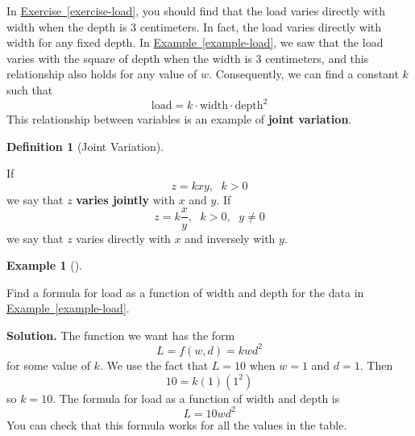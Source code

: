 \documentclass[10pt,]{book}
\newcommand{\terminology}[1]{\textbf{#1}}
\theoremstyle{plain}
\theoremstyle{definition}
\newtheorem{definition}[theorem]{Definition}
\theoremstyle{definition}
\theoremstyle{definition}
\newtheorem{example}[theorem]{Example}
\theoremstyle{definition}
\theoremstyle{definition}
\numberwithin{equation}{section}
\newcommand{\gt}{ > }
\begin{document}
    In \hyperref[exercise-load]{Exercise~\ref{exercise-load}}, you should find that the load varies directly with width when the depth is \(3\) centimeters. In fact, the load varies directly with width for any fixed depth. In \hyperref[example-load]{Example~\ref{example-load}}, we saw that the load varies with the square of depth when the width is \(3\) centimeters, and this relationship also holds for any value of \(w\). Consequently, we can find a constant \(k\) such that 
    \begin{equation*}\text{load} = k \cdot \text{width} \cdot \text{depth}^2\end{equation*}
    This relationship between variables is an example of \terminology{joint variation}.
%
\begin{definition}[Joint Variation]\label{definition-6}
%
\par

    If\begin{equation*}z = kxy \text{, } ~~ k \gt 0\end{equation*}
    we say that \(z\) \terminology{varies jointly} with \(x\) and \(y\). If
    \begin{equation*}z = k\frac{x}{y}\text{, } ~~ k \gt 0\text{, } ~~ y  \ne 0\end{equation*}
    we say that \(z\) varies directly with \(x\) and inversely with \(y\).
%
\end{definition}
\begin{example}[]\label{example-load2}

    Find a formula for load as a function of width and depth for the data in \hyperref[example-load]{Example~\ref{example-load}}.
%
\par\medskip\noindent%
\textbf{Solution.}\quad 
    The function we want has the form
    \begin{equation*}L = f (w, d) = kwd^2\end{equation*}
    for some value of \(k\). We use the fact that \(L = 10\) when \(w = 1\) and \(d = 1\). Then
    \begin{equation*}10 = k(1)(1^2)\end{equation*}
    so \(k = 10\). The formula for load as a function of width and depth is
    \begin{equation*}L = 10wd^2\end{equation*}
    You can check that this formula works for all the values in the table.
%
\end{example}
\end{document}
